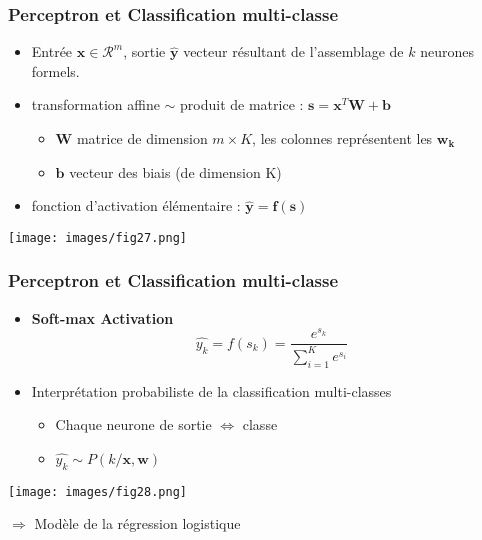 \documentclass[9pt]{beamer}
\newcommand \ve[1]{\mathbf{#1}}
\begin{document}
\begin{frame}
\frametitle{Perceptron et Classification multi-classe}
\begin{block}{}
\begin{itemize}
\item Entrée $\ve{x} \in \mathcal{R}^m$, sortie $\ve{\hat{y}}$ vecteur résultant de l'assemblage de $k$ neurones formels. 
\item transformation affine $\sim$ produit de matrice : $\ve{s}=\ve{x}^T\ve{W}+\ve{b}$
\begin{itemize}
\item $\ve{W}$ matrice de dimension $m\times K$, les colonnes représentent les $\ve{w_k}$
\item $\ve{b}$ vecteur des biais (de dimension K)
\end{itemize}
\item fonction d'activation élémentaire : $\ve{\hat{y} }= \ve{f}(\ve{s})$
\end{itemize}
\end{block}

\begin{center}
\texttt{[image: images/fig27.png]}
\end{center}
\end{frame}

\begin{frame}
\frametitle{Perceptron et Classification multi-classe}
\begin{minipage}[c]{0.4\linewidth}
\begin{itemize}
\item \textbf{Soft-max Activation}
\[
\hat{y_k} = f(s_k) = \frac{e^{s_k}}{\sum_{i=1}^K e^{s_i}}
\]
\item Interprétation probabiliste de la classification multi-classes
\begin{itemize}
\item Chaque neurone de sortie $\Leftrightarrow$ classe
\item $\hat{y_k} \sim P(k/\ve{x},\ve{w})$
\end{itemize}
\end{itemize}
\end{minipage}
\begin{minipage}[c]{0.5\linewidth}
\texttt{[image: images/fig28.png]}
\end{minipage}
\begin{alertblock}{}
\begin{center}
$\Rightarrow$ Modèle de la régression logistique
\end{center}
\end{alertblock}
\end{frame}
\end{document}
